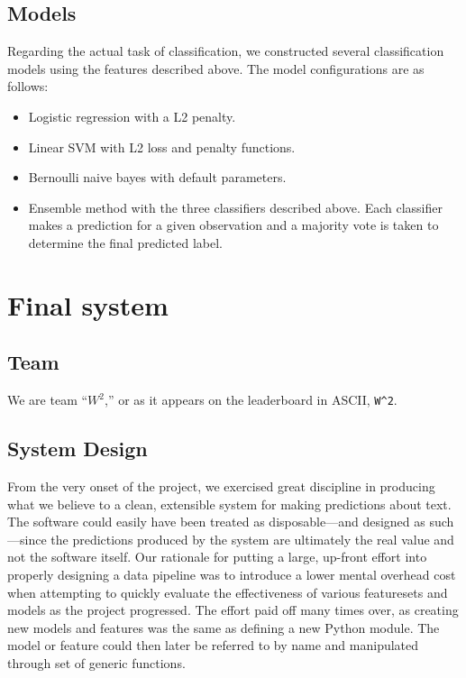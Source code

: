 \documentclass[
10pt, %
a4paper, %
oneside, %
headinclude,footinclude, %
BCOR5mm, %
]{scrartcl}
\begin{document}

\subsection{Models}
Regarding the actual task of classification, we constructed several 
classification models using the features described above. The model 
configurations are as follows:

\begin{itemize}
	\item Logistic regression with a L2 penalty.
	\item Linear SVM with L2 loss and penalty functions.
	\item Bernoulli naive bayes with default parameters.
	\item Ensemble method with the three classifiers described above. Each 
	classifier makes a prediction for a given observation and a majority vote is
	taken to determine the final predicted label.
\end{itemize}


\section{Final system}

\subsection{Team}

We are team ``$W^2$,'' or as it appears on the leaderboard in ASCII,
\texttt{W\string^2}.

\subsection{System Design}

From the very onset of the project, we exercised great discipline in producing
what we believe to a clean, extensible system for making predictions about text.
The software could easily have been treated as disposable---and designed as such
---since the predictions produced by the system are ultimately the real value
and not the software itself. Our rationale for putting a large, up-front effort
into properly designing a data pipeline was to introduce a lower mental overhead
cost when attempting to quickly evaluate the effectiveness of various
featuresets and models as the project progressed. The effort paid off many times
over, as creating new models and features was the same as defining a new Python
module. The model or feature could then later be referred to by name and
manipulated through set of generic functions.
\end{document}
